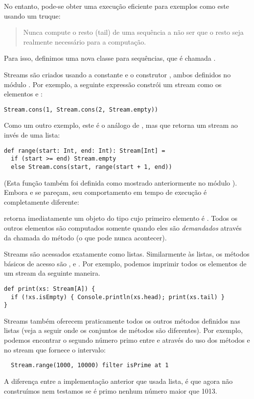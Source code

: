 No entanto, pode-se obter uma execução eficiente para exemplos como este usando
um truque:
\begin{quote}
 Nunca compute o resto (tail) de uma sequência a não ser que o resto seja realmente
necessário para a computação.
\end{quote}
Para isso, definimos uma nova classe para sequências, que é chamada .

Streams são criados usando a constante   e o construtor ,
ambos definidos no módulo . Por exemplo, a seguinte expressão constrói
um stream como os elementos  e :
\begin{lstlisting}
Stream.cons(1, Stream.cons(2, Stream.empty))
\end{lstlisting}
Como um outro exemplo, este é o análogo de ,
mas que retorna um stream ao invés de uma lista:
\begin{lstlisting}
def range(start: Int, end: Int): Stream[Int] =
  if (start >= end) Stream.empty
  else Stream.cons(start, range(start + 1, end))
\end{lstlisting}
(Esta função também foi definida como mostrado anteriormente no módulo 
).  Embora  e  se pareçam,
seu comportamento em tempo de execução é completamente diferente: 

 retorna imediatamente um objeto do tipo  cujo primeiro
elemento é .  Todos os outros elementos são computados somente quando eles são 
\emph{demandados} através da chamada do método  (o que pode nunca acontecer).  

Streams são acessados exatamente como listas. Similarmente às listas, os métodos básicos de acesso são
 ,  e . Por exemplo, podemos
imprimir todos os elementos de um stream da seguinte maneira.
\begin{lstlisting}
def print(xs: Stream[A]) {
  if (!xs.isEmpty) { Console.println(xs.head); print(xs.tail) }
}
\end{lstlisting}
Streams também oferecem praticamente todos os outros métodos definidos nas listas (veja a seguir onde
os conjuntos de métodos são diferentes). Por exemplo, podemos encontrar o segundo número primo entre 
 e  através do uso dos métodos 
 e  no stream que fornece o intervalo:
\begin{lstlisting}
  Stream.range(1000, 10000) filter isPrime at 1
\end{lstlisting}
A diferença entre a implementação anterior que usada lista, é que agora não
construímos nem testamos se é primo nenhum número maior que 1013.

